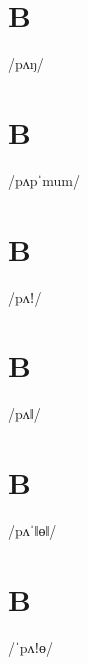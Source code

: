 \documentclass[10pt,a4paper,twoside]{book}
\begin{document}
\section*{B}

\begin{multicols}{3}
 {/pʌŋ/} {}
\end{multicols}

\section*{B}

\begin{multicols}{3}
 {/pʌpˈmum/} {}
\end{multicols}

\section*{B}

\begin{multicols}{3}
 {/pʌǃ/} {}
\end{multicols}

\section*{B}

\begin{multicols}{3}
 {/pʌǁ/} {}
\end{multicols}

\section*{B}

\begin{multicols}{3}
 {/pʌˈǁɵǁ/} {}
\end{multicols}

\section*{B}

\begin{multicols}{3}
 {/ˈpʌǃɵ/} {}
\end{multicols}
\end{document}
